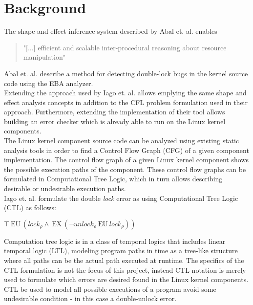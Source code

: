 \section{Background}

The shape-and-effect inference system described by Abal et. al. \cite{Abal2017EffectiveBF} enables \begin{quote}
    "[...] efficient and scalable inter-procedural reasoning about resource manipulation"
\end{quote}
 
\noindent Abal et. al. describe a method for detecting double-lock bugs in the kernel source code using the EBA analyzer. \\

\noindent Extending the approach used by Iago et. al. allows emplying the same shape and effect analysis concepts in addition to the CFL problem formulation used in their approach. Furthermore, extending the implementation of their tool allows building an error checker which is already able to run on the Linux kernel components. \\

\noindent The Linux kernel component source code can be analyzed using existing static analysis tools in order to find a Control Flow Graph (CFG) of a given component implementation. The control flow graph of a given Linux kernel component shows the possible execution paths of the component. These control flow graphs can be formulated in Computational Tree Logic, which in turn allows describing desirable or undesirable execution paths.  \\

\noindent Iago et. al. formulate the double \textit{lock} error as using Computational Tree Logic (CTL) as follows: 

\begin{center}
    $\top\:\mathrm{EU}\:\left({l o c k}_{\rho} \wedge\:\mathrm{EX}\:\left(\neg {u n l o c k}_{\rho}\:\mathrm{EU}\:{l o c k}_{\rho}\right)\right)$
\end{center}

\noindent Computation tree logic is in a class of temporal logics that includes linear temporal logic (LTL), modeling program paths in time as a tree-like structure where all paths can be the actual path executed at runtime. The specifics of the CTL formulation is not the focus of this project, instead CTL notation is merely used to formulate which errors are desired found in the Linux kernel components. CTL be used to model all possible executions of a program avoid some undesirable condition - in this case a double-unlock error. \\

